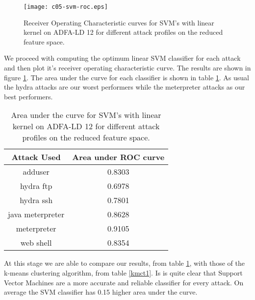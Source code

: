 \documentclass[reqno,openany,12pt]{amsbook}
\begin{document}
\begin{figure}
\texttt{[image: c05-svm-roc.eps]}
\caption[ROC curves for linear SVM's for different attack profiles.]{Receiver Operating Characteristic curves for SVM's with linear kernel on ADFA-LD 12 for different attack profiles on the reduced feature space.}
\label{svm-fr2}
\end{figure}

We proceed with computing the optimum linear SVM classifier for each attack and then plot it's receiver operating characteristic curve. The results are shown in figure \ref{svm-fr2}. The area under the curve for each classifier is shown in table \ref{svmt2}. As usual the hydra attacks are our worst performers while the meterpreter attacks as our best performers.

\begin{table}
\begin{tabular}{|c|c|}
\hline
Attack Used &  Area under ROC curve \\ \hline 
adduser          & 0.8303 \\ \hline
hydra ftp        & 0.6978 \\ \hline
hydra ssh        & 0.7801 \\ \hline
java meterpreter & 0.8628 \\ \hline
meterpreter      & 0.9105 \\ \hline
web shell        & 0.8354 \\ \hline
\end{tabular}
\vspace{5pt}
\caption[Area under the curve for linear SVM's for different attack profiles.]{Area under the curve for SVM's with linear kernel on ADFA-LD 12 for different attack profiles on the reduced feature space.}
\label{svmt2}
\end{table}


At this stage we are able to compare our results, from table \ref{svmt2}, with those of the k-means clustering algorithm, from table \ref{kmct1}. Is is quite clear that Support Vector Machines are a more accurate and reliable classifier for every attack. On average the SVM classifier has 0.15 higher area under the curve.
\end{document}
